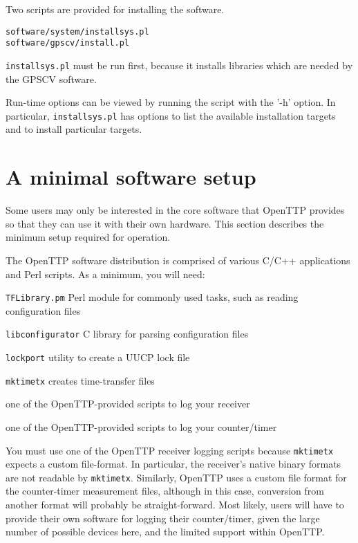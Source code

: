 \documentclass[11pt,a4paper,openany,oneside]{book}
\newcommand{\cc}[1]{{\texttt{#1}}}
\newenvironment{description*}%
  {\setlength{\parskip}{0pt}%
	 \begin{description}%
		\setlength{\topsep}{-12pt}%
		\setlength{\itemindent}{-12pt}%
    \setlength{\itemsep}{0pt}%
		\setlength{\itemsep}{0pt}}%
  {\end{description}}
\begin{document}
Two scripts are provided for installing the software.
\begin{lstlisting}
software/system/installsys.pl
software/gpscv/install.pl
\end{lstlisting}

\cc{installsys.pl} must be run first, because it installs libraries which are needed by the GPSCV software.

Run-time options can be viewed by running the script with the '-h' option. In particular, \cc{installsys.pl}
has options to list the available installation targets and to install particular targets.

\section{A minimal software setup}

Some users may only be interested in the core software that OpenTTP provides so that they can use
it with their own hardware. This section describes the minimum setup required for operation.

The OpenTTP software distribution is comprised of various C/C++ applications and Perl scripts.
As a minimum, you will need:
\begin{description*}
	\item \cc{TFLibrary.pm} Perl module for commonly used tasks, such as reading configuration files
	\item \cc{libconfigurator} C library for parsing configuration files
	\item \cc{lockport} utility to create a UUCP lock file
	\item \cc{mktimetx} creates time-transfer files
	\item one of the OpenTTP-provided scripts to log your receiver
	\item one of the OpenTTP-provided scripts to log your counter/timer
\end{description*}

You must use one of the OpenTTP receiver logging scripts because \cc{mktimetx} expects a custom file-format. In particular, the
receiver's native binary formats are not readable by \cc{mktimetx}. Similarly, OpenTTP uses a custom file
format for the counter-timer measurement files, although in this case, conversion from another format
will probably be straight-forward. Most likely, users will have to provide their own software for
logging their counter/timer, given the large number of possible devices here, and the limited
support within OpenTTP.
\end{document}
